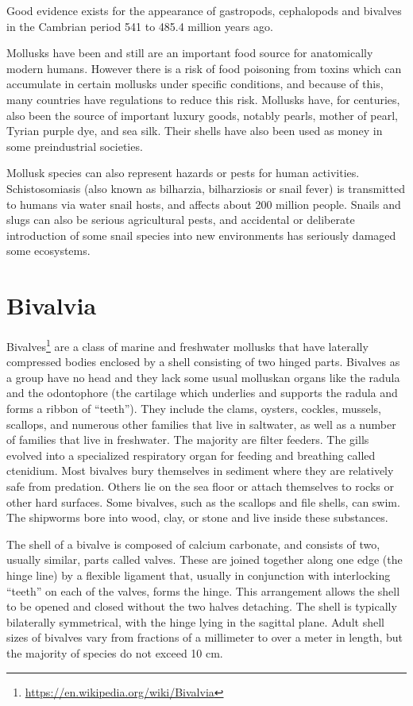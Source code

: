 \documentclass[]{book}
\let\rmarkdownfootnote\footnote%
\def\footnote{\protect\rmarkdownfootnote}
\renewcommand{\href}[2]{#2\footnote{\url{#1}}}
\theoremstyle{definition}
\theoremstyle{definition}
\theoremstyle{definition}
\theoremstyle{remark}
\begin{document}
Good evidence exists for the appearance of gastropods, cephalopods and
bivalves in the Cambrian period 541 to 485.4 million years ago.

Mollusks have been and still are an important food source for
anatomically modern humans. However there is a risk of food poisoning
from toxins which can accumulate in certain mollusks under specific
conditions, and because of this, many countries have regulations to
reduce this risk. Mollusks have, for centuries, also been the source of
important luxury goods, notably pearls, mother of pearl, Tyrian purple
dye, and sea silk. Their shells have also been used as money in some
preindustrial societies.

Mollusk species can also represent hazards or pests for human
activities. Schistosomiasis (also known as bilharzia, bilharziosis or
snail fever) is transmitted to humans via water snail hosts, and affects
about 200 million people. Snails and slugs can also be serious
agricultural pests, and accidental or deliberate introduction of some
snail species into new environments has seriously damaged some
ecosystems.

\section{Bivalvia}\label{bivalvia}

\href{https://en.wikipedia.org/wiki/Bivalvia}{Bivalves} are a class of
marine and freshwater mollusks that have laterally compressed bodies
enclosed by a shell consisting of two hinged parts. Bivalves as a group
have no head and they lack some usual molluskan organs like the radula
and the odontophore (the cartilage which underlies and supports the
radula and forms a ribbon of ``teeth''). They include the clams,
oysters, cockles, mussels, scallops, and numerous other families that
live in saltwater, as well as a number of families that live in
freshwater. The majority are filter feeders. The gills evolved into a
specialized respiratory organ for feeding and breathing called
ctenidium. Most bivalves bury themselves in sediment where they are
relatively safe from predation. Others lie on the sea floor or attach
themselves to rocks or other hard surfaces. Some bivalves, such as the
scallops and file shells, can swim. The shipworms bore into wood, clay,
or stone and live inside these substances.

The shell of a bivalve is composed of calcium carbonate, and consists of
two, usually similar, parts called valves. These are joined together
along one edge (the hinge line) by a flexible ligament that, usually in
conjunction with interlocking ``teeth'' on each of the valves, forms the
hinge. This arrangement allows the shell to be opened and closed without
the two halves detaching. The shell is typically bilaterally
symmetrical, with the hinge lying in the sagittal plane. Adult shell
sizes of bivalves vary from fractions of a millimeter to over a meter in
length, but the majority of species do not exceed 10 cm.
\end{document}
